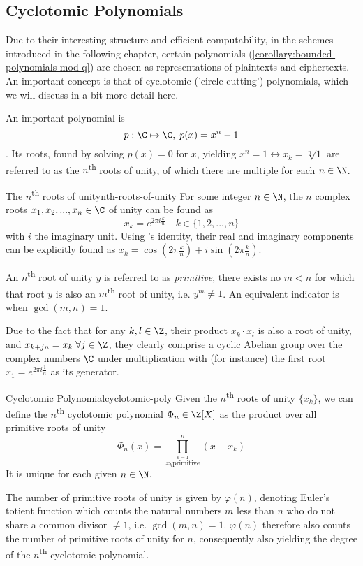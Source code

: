 \subsection{Cyclotomic Polynomials}
Due to their interesting structure and efficient computability, in the schemes introduced in the following chapter, certain polynomials (\autoref{corollary:bounded-polynomials-mod-q}) are chosen as representations of plaintexts and ciphertexts.
An important concept is that of cyclotomic ('circle-cutting') polynomials, which we will discuss in a bit more detail here.

An important polynomial is $$p: \C \mapsto \C, \; p(x) = x^n - 1$$.
Its roots, found by solving $p(x) = 0$ for $x$, yielding $x^n = 1 \leftrightarrow x_k = \sqrt[n]{1}$ are referred to as the $n$\textsuperscript{th} roots of unity, of which there are multiple for each $n \in \N$.

\begin{lemma}{The $n$\textsuperscript{th} roots of unity}{nth-roots-of-unity}
  For some integer $n \in \N$, the $n$ complex roots $x_1, x_2, ..., x_n \in \C$ of unity
  can be found as $$x_k = e^{2\pi i \frac{k}{n}} \quad k \in \{1, 2, ..., n\}$$
  with $i$ the imaginary unit.
  Using 's identity, their real and imaginary components can be explicitly found as
  $x_k = \cos(2\pi \frac{k}{n}) + i \sin(2\pi \frac{k}{n})$.

  An $n$\textsuperscript{th} root of unity $y$ is referred to as \textit{primitive}, 
  there exists no $m < n$ for which that root $y$ is also an $m$\textsuperscript{th} root of unity, i.e. $y^m \neq 1$.
  An equivalent indicator is when $\gcd(m, n) = 1$.
\end{lemma}
Due to the fact that for any $k, l \in \Z$, their product $x_k \cdot x_l$ is also a root of unity, and
$x_{k+jn} = x_k \; \forall j \in \Z$, they clearly comprise a cyclic Abelian group over the complex numbers
$\C$ under multiplication with (for instance) the first root $x_1 = e^{2\pi i \frac{1}{n}}$ as its generator.

\begin{definition}{Cyclotomic Polynomial}{cyclotomic-poly}
  Given the $n$\textsuperscript{th} roots of unity $\{x_k\}$, we can define the $n$\textsuperscript{th}
  cyclotomic polynomial $\Phi_n \in \Z[X]$ as the product over all primitive roots of unity
  $$\Phi_n(x) = \prod_{\stackrel{k=1}{x_k \mathrm{primitive}}}^{n} (x - x_k)$$
  It is unique for each given $n \in \N$.
\end{definition}
The number of primitive roots of unity is given by $\varphi(n)$, denoting Euler's totient function which counts the
natural numbers $m$ less than $n$ who do not share a common divisor $\neq 1$, i.e. $\gcd(m, n) = 1$.
$\varphi(n)$ therefore also counts the number of primitive roots of unity for $n$,
consequently also yielding the degree of the $n$\textsuperscript{th} cyclotomic polynomial.

